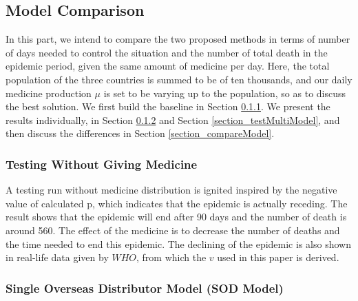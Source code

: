 \documentclass[12pt,a4paper,titlepage]{article}
\begin{document}
\subsection{Model Comparison}
\label{section_modelTest}

In this part, we intend to compare the two proposed methods in terms of number of days needed to control the situation and the number of total death in the epidemic period, given the same amount of medicine per day.  Here, the total population of the three countries is summed to be of ten thousands, and our daily medicine production $\mu$ is set to be varying up to the population, so as to discuss the best solution. We first build the baseline in Section \ref{model_baseline}. We present the results individually, in Section \ref{section_testSingleModel} and Section \ref{section_testMultiModel}, and then discuss the differences in Section \ref{section_compareModel}.

\subsubsection{Testing Without Giving Medicine}
\label{model_baseline}
A testing run without medicine distribution is ignited inspired by the negative value of calculated p, which indicates that the epidemic is actually receding. The result shows that the epidemic will end after 90 days and the number of death is around 560. The effect of the medicine is to decrease the number of deaths and the time needed to end this epidemic. The declining of the epidemic is also shown in real-life data given by $WHO$, from which the $v$ used in this paper is derived.

\subsubsection{Single Overseas Distributor Model (SOD Model)}
\label{section_testSingleModel}
\end{document}
